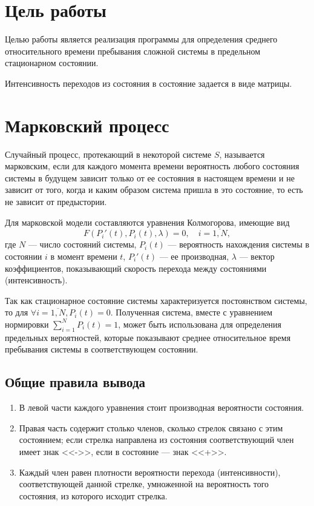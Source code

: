 \section*{Цель работы}

Целью работы является реализация программы для определения среднего
относительного времени пребывания сложной системы в предельном стационарном
состоянии.

Интенсивность переходов из состояния в состояние задается в виде матрицы.

\section*{Марковский процесс}

Случайный процесс, протекающий в некоторой системе $S$, называется
марковским, если для каждого момента времени вероятность любого состояния
системы в будущем зависит только от ее состояния в настоящем времени и не
зависит от того, когда и каким образом система пришла в это состояние, то есть
не зависит от предыстории.

Для марковской модели составляются уравнения Колмогорова, имеющие вид
\begin{equation}
    F(P_i'(t), P_i(t), \lambda) = 0, \quad i=\overline{1, N},
\end{equation}
где $N$ --- число состояний системы, $P_i(t)$ --- вероятность нахождения
системы в состоянии $i$ в момент времени $t$, $P_i'(t)$ --- ее производная,
$\lambda$ --- вектор коэффициентов, показывающий скорость перехода между
состояниями (интенсивность).

Так как стационарное состояние системы характеризуется постоянством системы, то
для $\forall i = \overline{1, N}, P_i(t) = 0$. Полученная система, вместе с
уравнением нормировки $\sum\limits_{i=1}^N P_i(t) = 1$, может быть использована для
определения предельных вероятностей, которые показывают среднее относительное
время пребывания системы в соответствующем состоянии.

\subsection*{Общие правила вывода}
\begin{enumerate}
    \item В левой части каждого уравнения стоит производная вероятности
        состояния.
    \item Правая часть содержит столько членов, сколько стрелок связано с этим
        состоянием; если стрелка направлена из состояния соответствующий член
        имеет знак <<->>, если в состояние --- знак <<+>>.
    \item Каждый член равен плотности вероятности перехода (интенсивности),
        соответствующей данной стрелке, умноженной на вероятность того состояния,
        из которого исходит стрелка.
\end{enumerate}

